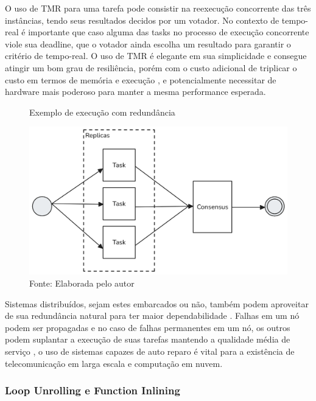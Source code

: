 O uso de TMR para uma tarefa pode consistir na reexecução concorrente das três instâncias, tendo seus resultados decidos por um votador. No contexto de tempo-real é importante que caso alguma das tasks no processo de execução concorrente viole sua deadline, que o votador ainda escolha um resultado para garantir o critério de tempo-real. O uso de TMR é elegante em sua simplicidade e consegue atingir um bom grau de resiliência, porém com o custo adicional de triplicar o custo em termos de memória e execução \cite{DependabilityInEmbeddedSystems}, e potencialmente necessitar de hardware mais poderoso para manter a mesma performance esperada.

\begin{figure}[H]
    \centering
	\captionsetup{justification=centering}
    \caption{Exemplo de execução com redundância}
    \includegraphics[width=1.0\textwidth]{assets/redundancia_tmr.png}
	\captionsetup{justification=raggedright}
    \caption*{Fonte: Elaborada pelo autor}
    \label{fig:redundanciaTMR}
\end{figure}

Sistemas distribuídos, sejam estes embarcados ou não, também podem aproveitar de sua redundância natural para ter maior dependabilidade \cite{MakingReliableDistSystems}. Falhas em um nó podem ser propagadas e no caso de falhas permanentes em um nó, os outros podem suplantar a execução de suas tarefas mantendo a qualidade média de serviço \cite{MakingReliableDistSystems} \cite{SchedAndOptOfDistributedFT}, o uso de sistemas capazes de auto reparo é vital para a existência de telecomunicação em larga escala e computação em nuvem.

\subsubsection{Loop Unrolling e Function Inlining}

